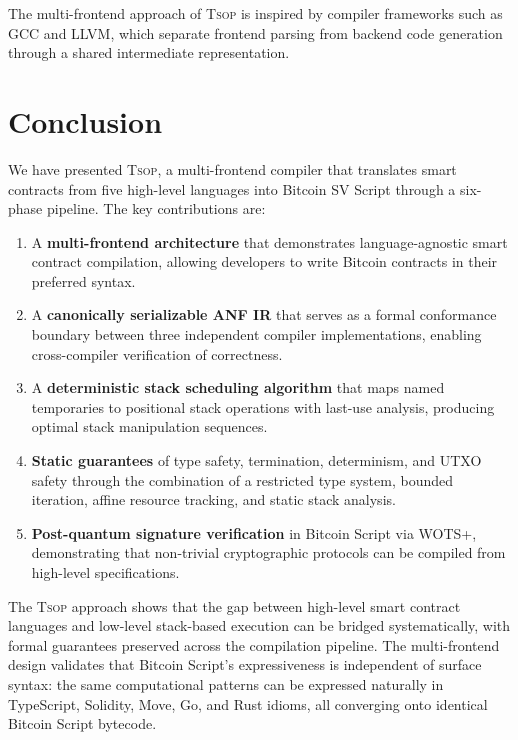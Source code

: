 \documentclass[11pt,a4paper]{article}
\newcommand{\tsop}{\textsc{Tsop}}
\begin{document}
The multi-frontend approach of \tsop{} is inspired by compiler frameworks
such as GCC and LLVM, which separate frontend parsing from backend code
generation through a shared intermediate representation.

\section{Conclusion}
\label{sec:conclusion}

We have presented \tsop{}, a multi-frontend compiler that translates smart
contracts from five high-level languages into Bitcoin SV Script through a
six-phase pipeline. The key contributions are:

\begin{enumerate}[label=(\roman*)]
  \item A \textbf{multi-frontend architecture} that demonstrates
    language-agnostic smart contract compilation, allowing developers to
    write Bitcoin contracts in their preferred syntax.
  \item A \textbf{canonically serializable ANF IR} that serves as a formal
    conformance boundary between three independent compiler implementations,
    enabling cross-compiler verification of correctness.
  \item A \textbf{deterministic stack scheduling algorithm} that maps named
    temporaries to positional stack operations with last-use analysis,
    producing optimal stack manipulation sequences.
  \item \textbf{Static guarantees} of type safety, termination, determinism,
    and UTXO safety through the combination of a restricted type system,
    bounded iteration, affine resource tracking, and static stack analysis.
  \item \textbf{Post-quantum signature verification} in Bitcoin Script
    via WOTS+, demonstrating that non-trivial cryptographic protocols can
    be compiled from high-level specifications.
\end{enumerate}

The \tsop{} approach shows that the gap between high-level smart contract
languages and low-level stack-based execution can be bridged systematically,
with formal guarantees preserved across the compilation pipeline. The
multi-frontend design validates that Bitcoin Script's expressiveness is
independent of surface syntax: the same computational patterns can be
expressed naturally in TypeScript, Solidity, Move, Go, and Rust idioms,
all converging onto identical Bitcoin Script bytecode.
\end{document}
